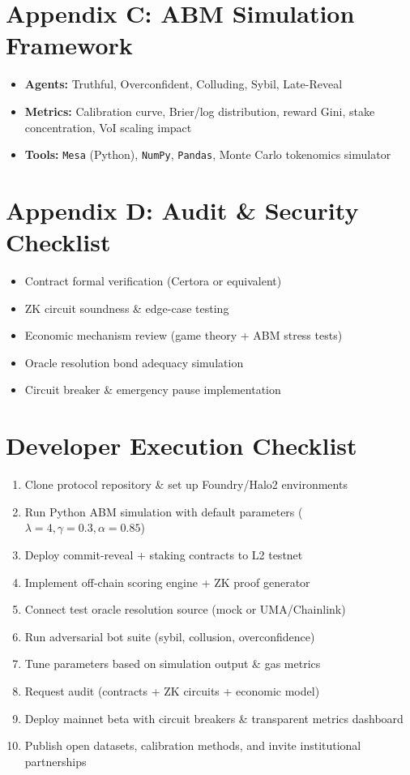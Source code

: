 \documentclass[11pt,a4paper]{article}
\begin{document}
\section*{Appendix C: ABM Simulation Framework}
\begin{itemize}[leftmargin=*]
    \item \textbf{Agents:} Truthful, Overconfident, Colluding, Sybil, Late-Reveal
    \item \textbf{Metrics:} Calibration curve, Brier/log distribution, reward Gini, stake concentration, VoI scaling impact
    \item \textbf{Tools:} \texttt{Mesa} (Python), \texttt{NumPy}, \texttt{Pandas}, Monte Carlo tokenomics simulator
\end{itemize}

\section*{Appendix D: Audit \& Security Checklist}
\begin{itemize}[leftmargin=*]
    \item[$\square$] Contract formal verification (Certora or equivalent)
    \item[$\square$] ZK circuit soundness \& edge-case testing
    \item[$\square$] Economic mechanism review (game theory + ABM stress tests)
    \item[$\square$] Oracle resolution bond adequacy simulation
    \item[$\square$] Circuit breaker \& emergency pause implementation
\end{itemize}

\section*{Developer Execution Checklist}
\begin{enumerate}[leftmargin=*]
    \item[$\square$] Clone protocol repository \& set up Foundry/Halo2 environments
    \item[$\square$] Run Python ABM simulation with default parameters ($\lambda=4, \gamma=0.3, \alpha=0.85$)
    \item[$\square$] Deploy commit-reveal + staking contracts to L2 testnet
    \item[$\square$] Implement off-chain scoring engine + ZK proof generator
    \item[$\square$] Connect test oracle resolution source (mock or UMA/Chainlink)
    \item[$\square$] Run adversarial bot suite (sybil, collusion, overconfidence)
    \item[$\square$] Tune parameters based on simulation output \& gas metrics
    \item[$\square$] Request audit (contracts + ZK circuits + economic model)
    \item[$\square$] Deploy mainnet beta with circuit breakers \& transparent metrics dashboard
    \item[$\square$] Publish open datasets, calibration methods, and invite institutional partnerships
\end{enumerate}
\end{document}
